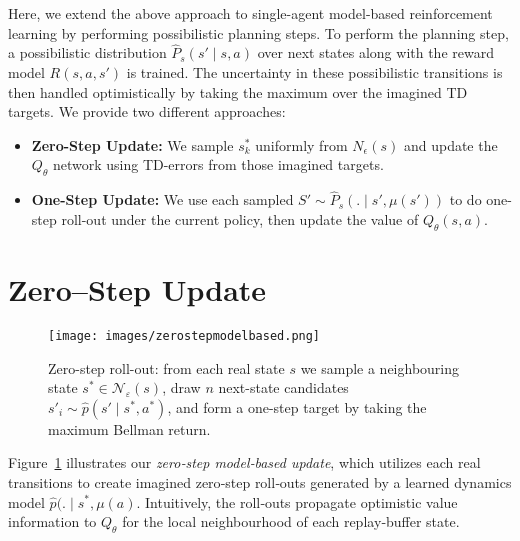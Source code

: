 \documentclass[11pt,a4paper]{report}
\begin{document}
Here, we extend the above approach to single-agent model-based reinforcement learning by performing possibilistic planning steps. To perform the planning step, a possibilistic distribution \(\hat{P}_s(s'\mid s,a)\) over next states along with the reward model $R(s, a, s')$ is trained. The uncertainty in these possibilistic transitions is then handled optimistically by taking the maximum over the imagined TD targets. We provide two different approaches:

\begin{itemize}
  \item \textbf{Zero-Step Update:} We sample \(s^*_k\) uniformly from \(N_\epsilon(s)\) and update the \(Q_\theta\) network using TD-errors from those imagined targets.
  \item \textbf{One-Step Update:} We use each sampled \(S' \sim \hat{P}_s( . \mid s',\mu(s'))\) to do one-step roll-out under the current policy, then update the value of \(Q_\theta(s,a)\).
\end{itemize}
\section{Zero–Step Update}
\label{sec:zero_step_mbu}

\begin{figure}[htbp]
  \centering
  \texttt{[image: images/zerostepmodelbased.png]}
\caption{Zero-step roll-out: from each real state \(s\) we sample a neighbouring state \(s^{*} \in \mathcal{N}_\varepsilon(s)\), draw \(n\) next-state candidates \(s'_i \sim \hat{p}(s' \mid s^{*}, a^{*})\), and form a one-step target by taking the maximum Bellman return.}
\label{fig:zero_step_diag}
\end{figure}

Figure~\ref{fig:zero_step_diag} illustrates our \emph{zero‐step model‐based update}, which utilizes each real transitions to create imagined zero‐step roll‐outs generated by a learned dynamics model \(\hat p(.\mid s^*,\mu(a)\). Intuitively, the roll‐outs propagate optimistic value information to \(Q_\theta\) for the local neighbourhood of each replay‐buffer state.
\end{document}
